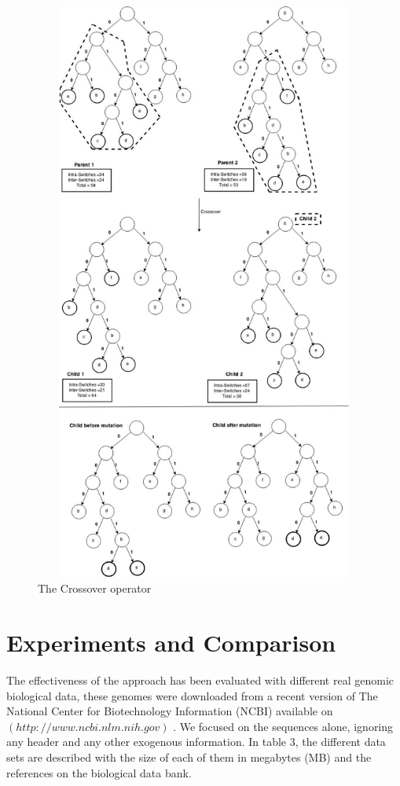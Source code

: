 \documentclass[preprint,12pt]{elsarticle}
\begin{document}
\begin{figure}[tbph]
\begin{center}
\includegraphics[width=400pt,height=545pt]{Images/Drawing1-1.jpg}
\caption{The Crossover operator}
\end{center}
\label{Fig1}
\end{figure}

\section{Experiments and Comparison}

The effectiveness of the approach has been evaluated with different real genomic biological data, these genomes were downloaded from a recent version of The National Center for Biotechnology Information (NCBI) available on $(http://www.ncbi.nlm.nih.gov)$ \cite{pruitt2009ncbi}. We focused on the sequences alone, ignoring any header and any other exogenous information. In table 3, the different data sets are described with the size  of each of them in megabytes (MB) and the references on the biological data bank.
\end{document}
